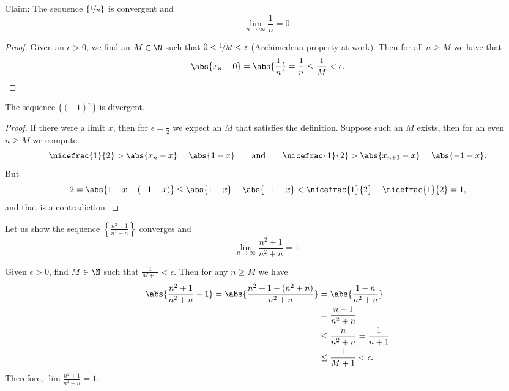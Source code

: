 \documentclass[12pt]{book}
\begin{document}
\begin{example}
Claim: The sequence $\{ \nicefrac{1}{n} \}$ is convergent and
\begin{equation*}
\lim_{n\to \infty} \frac{1}{n} = 0 .
\end{equation*}
\begin{proof} Given an $\epsilon > 0$, we find an $M \in \N$ such that
$0 < \nicefrac{1}{M} < \epsilon$
(\hyperref[thm:arch:i]{Archimedean property} at work).
Then for all $n \geq M$ we have that
\begin{equation*}
\abs{x_n - 0} = \abs{\frac{1}{n}} = \frac{1}{n} \leq \frac{1}{M} < \epsilon .
\end{equation*}
\end{proof}
\end{example}

\begin{example}
The sequence $\{ {(-1)}^n \}$ is divergent.
\begin{proof} If there
were a limit $x$, then for $\epsilon = \frac{1}{2}$ we expect an $M$ that
satisfies the definition.
Suppose
such an $M$ exists, then for an even $n \geq M$ we compute
\begin{equation*}
\nicefrac{1}{2} > \abs{x_n - x}  = \abs{1 - x}
\qquad \text{and} \qquad
\nicefrac{1}{2} > \abs{x_{n+1} - x}  = \abs{-1 - x} .
\end{equation*}
But
\begin{equation*}
2 = \abs{1 - x - (-1 -x)} \leq
\abs{1 - x} + \abs{-1 -x} < \nicefrac{1}{2} + \nicefrac{1}{2} = 1 ,
\end{equation*}
and that is a contradiction.
\end{proof}
\end{example}

\begin{example}
Let us show the sequence $\left\{ \frac{n^2+1}{n^2+n} \right\}$ converges and
\begin{equation*}
\lim_{n\to\infty} \frac{n^2+1}{n^2+n} = 1 .
\end{equation*}

Given $\epsilon > 0$,
find $M \in \N$ such that $\frac{1}{M+1} < \epsilon$.
Then for any $n \geq
M$ we have
\begin{equation*}
\begin{split}
\abs{\frac{n^2+1}{n^2+n} - 1}  =
\abs{\frac{n^2+1 - (n^2+n)}{n^2+n}}
& =
\abs{\frac{1 - n}{n^2+n}} \\
& =
\frac{n-1}{n^2+n} \\
& \leq 
\frac{n}{n^2+n} 
 =
\frac{1}{n+1}  \\
& \leq \frac{1}{M+1} < \epsilon .
\end{split}
\end{equation*}
Therefore,
$\lim \frac{n^2+1}{n^2+n} = 1$.
\end{example}
\end{document}
